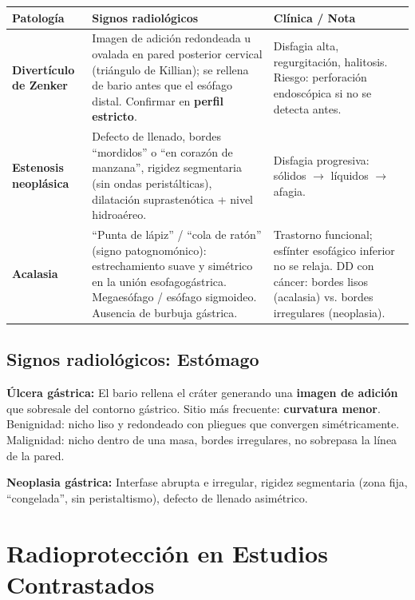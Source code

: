 {\renewcommand{\arraystretch}{1.3}
	\begin{center}
		\begin{tabular}{>{\bfseries}p{3.5cm} p{5cm} p{5cm}}
			\hline
			\textbf{Patología} & \textbf{Signos radiológicos} & \textbf{Clínica / Nota} \\
			\hline
			Divertículo de Zenker & Imagen de adición redondeada u ovalada en pared posterior cervical (triángulo de Killian); se rellena de bario antes que el esófago distal. Confirmar en \textbf{perfil estricto}. & Disfagia alta, regurgitación, halitosis. Riesgo: perforación endoscópica si no se detecta antes. \\[0.5em]
			\hline
			Estenosis neoplásica & Defecto de llenado, bordes ``mordidos'' o ``en corazón de manzana'', rigidez segmentaria (sin ondas peristálticas), dilatación suprastenótica + nivel hidroaéreo. & Disfagia progresiva: sólidos $\to$ líquidos $\to$ afagia. \\[0.5em]
			\hline
			Acalasia & ``Punta de lápiz'' / ``cola de ratón'' (signo patognomónico): estrechamiento suave y simétrico en la unión esofagogástrica. Megaesófago / esófago sigmoideo. Ausencia de burbuja gástrica. & Trastorno funcional; esfínter esofágico inferior no se relaja. DD con cáncer: bordes lisos (acalasia) vs. bordes irregulares (neoplasia). \\
			\hline
		\end{tabular}
	\end{center}
}

\subsection*{Signos radiológicos: Estómago}

\textbf{Úlcera gástrica:} El bario rellena el cráter generando una \textbf{imagen de adición} que sobresale del contorno gástrico. Sitio más frecuente: \textbf{curvatura menor}. Benignidad: nicho liso y redondeado con pliegues que convergen simétricamente. Malignidad: nicho dentro de una masa, bordes irregulares, no sobrepasa la línea de la pared.

\textbf{Neoplasia gástrica:} Interfase abrupta e irregular, rigidez segmentaria (zona fija, ``congelada'', sin peristaltismo), defecto de llenado asimétrico.

\section*{Radioprotección en Estudios Contrastados}

